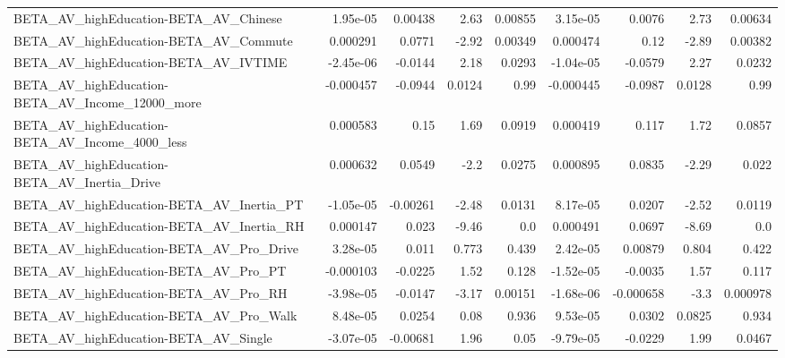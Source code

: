 \begin{tabular}{lrrrrrrrr}
BETA\_AV\_highEducation-BETA\_AV\_Chinese              &    1.95e-05 &      0.00438 &     2.63 &  0.00855 &   3.15e-05 &      0.0076 &         2.73 &       0.00634 \\
BETA\_AV\_highEducation-BETA\_AV\_Commute              &    0.000291 &       0.0771 &    -2.92 &  0.00349 &   0.000474 &        0.12 &        -2.89 &       0.00382 \\
BETA\_AV\_highEducation-BETA\_AV\_IVTIME               &   -2.45e-06 &      -0.0144 &     2.18 &   0.0293 &  -1.04e-05 &     -0.0579 &         2.27 &        0.0232 \\
BETA\_AV\_highEducation-BETA\_AV\_Income\_12000\_more    &   -0.000457 &      -0.0944 &   0.0124 &     0.99 &  -0.000445 &     -0.0987 &       0.0128 &          0.99 \\
BETA\_AV\_highEducation-BETA\_AV\_Income\_4000\_less     &    0.000583 &         0.15 &     1.69 &   0.0919 &   0.000419 &       0.117 &         1.72 &        0.0857 \\
BETA\_AV\_highEducation-BETA\_AV\_Inertia\_Drive        &    0.000632 &       0.0549 &     -2.2 &   0.0275 &   0.000895 &      0.0835 &        -2.29 &         0.022 \\
BETA\_AV\_highEducation-BETA\_AV\_Inertia\_PT           &   -1.05e-05 &     -0.00261 &    -2.48 &   0.0131 &   8.17e-05 &      0.0207 &        -2.52 &        0.0119 \\
BETA\_AV\_highEducation-BETA\_AV\_Inertia\_RH           &    0.000147 &        0.023 &    -9.46 &      0.0 &   0.000491 &      0.0697 &        -8.69 &           0.0 \\
BETA\_AV\_highEducation-BETA\_AV\_Pro\_Drive            &    3.28e-05 &        0.011 &    0.773 &    0.439 &   2.42e-05 &     0.00879 &        0.804 &         0.422 \\
BETA\_AV\_highEducation-BETA\_AV\_Pro\_PT               &   -0.000103 &      -0.0225 &     1.52 &    0.128 &  -1.52e-05 &     -0.0035 &         1.57 &         0.117 \\
BETA\_AV\_highEducation-BETA\_AV\_Pro\_RH               &   -3.98e-05 &      -0.0147 &    -3.17 &  0.00151 &  -1.68e-06 &   -0.000658 &         -3.3 &      0.000978 \\
BETA\_AV\_highEducation-BETA\_AV\_Pro\_Walk             &    8.48e-05 &       0.0254 &     0.08 &    0.936 &   9.53e-05 &      0.0302 &       0.0825 &         0.934 \\
BETA\_AV\_highEducation-BETA\_AV\_Single               &   -3.07e-05 &     -0.00681 &     1.96 &     0.05 &  -9.79e-05 &     -0.0229 &         1.99 &        0.0467 \\

\end{tabular}
